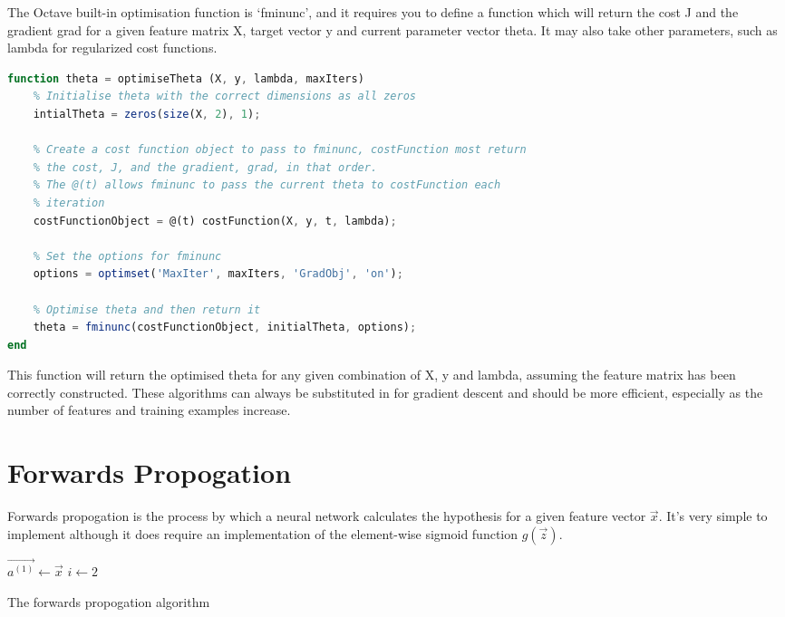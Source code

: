 \vspace{1em}

The Octave built-in optimisation function is `fminunc', and it requires you to define a function which will return the cost J and the gradient grad for a given
feature matrix X, target vector y and current parameter vector theta. It may also take other parameters, such as lambda for regularized cost functions.

\begin{lstlisting}[language=Octave]
function theta = optimiseTheta (X, y, lambda, maxIters)
    % Initialise theta with the correct dimensions as all zeros
    intialTheta = zeros(size(X, 2), 1);

    % Create a cost function object to pass to fminunc, costFunction most return
    % the cost, J, and the gradient, grad, in that order.
    % The @(t) allows fminunc to pass the current theta to costFunction each
    % iteration
    costFunctionObject = @(t) costFunction(X, y, t, lambda);

    % Set the options for fminunc
    options = optimset('MaxIter', maxIters, 'GradObj', 'on');

    % Optimise theta and then return it
    theta = fminunc(costFunctionObject, initialTheta, options);
end
\end{lstlisting}

This function will return the optimised theta for any given combination of X, y and lambda, assuming the feature matrix has been correctly constructed. These
algorithms can always be substituted in for gradient descent and should be more efficient, especially as the number of features and training examples increase.

\section{Forwards Propogation}

Forwards propogation is the process by which a neural network calculates the hypothesis for a given feature vector $\vec{x}$. It's very simple to implement
although it does require an implementation of the element-wise sigmoid function $g(\vec{z})$.

\vspace{1em}
\begin{algorithm}[H]
    \SetAlgoLined


    $\vec{a^{(1)}} \gets \vec{x}$ \;
    $i \gets 2$ \;

    \caption{The forwards propogation algorithm}
\end{algorithm}


